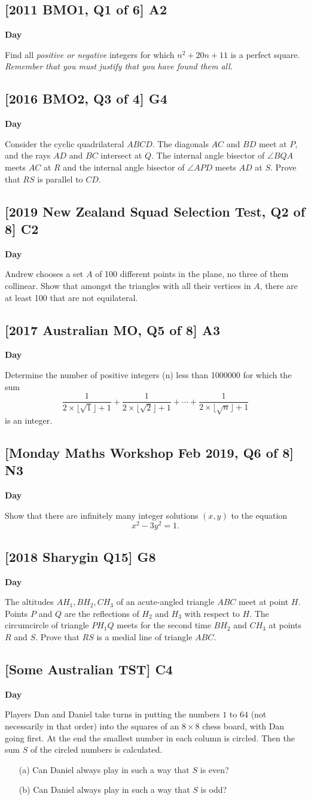 \documentclass[10pt]{article}
\newcommand{\themonth}{March}
\newcommand{\theyear}{2019}
\newcounter{day}
\newcounter{solution}
\newcounter{datenumber}
\newcommand{\problem}[4][0]{
	\newpage
	\subsection{[#3] \space #2} \hfill 
	{\large\textbf{Day \arabic{day}}} %
	\begin{flushleft} #4 \end{flushleft}
	\vspace{1em}
	\addtocounter{day}{1}
	\addtocounter{datenumber}{1}
	\setcounter{solution}{1}
}
\begin{document}
\problem[57]{A2}{2011 BMO1, Q1 of 6}{Find all \emph{positive or negative} integers for which $n^2+20n+11$ is a perfect square. \textit{Remember that you must justify that you have found them all.}}

\problem[58]{G4}{2016 BMO2, Q3 of 4}{Consider the cyclic quadrilateral \(ABCD\). The diagonals \(AC\) and \(BD\) meet at \(P\), and the rays \(AD\) and \(BC\) intersect at \(Q\). The internal angle bisector of \(\angle BQA\) meets \(AC\) at \(R\) and the internal angle bisector of \(\angle APD\) meets \(AD\) at \(S\). Prove that \(RS\) is parallel to \(CD\).}

\problem[59]{C2}{2019 New Zealand Squad Selection Test, Q2 of 8}{Andrew chooses a set $A$ of 100 different points in the plane, no three of them collinear. Show that amongst the triangles with all their vertices in $A$, there are at least 100 that are not equilateral.}

\problem[60]{A3}{2017 Australian MO, Q5 of 8}{Determine the number of positive integers (n) less than 1000000 for which the sum \[\frac{1}{2 \times \lfloor \sqrt{1} \rfloor + 1} + \frac{1}{2 \times \lfloor \sqrt{2} \rfloor + 1} + \cdots +\frac{1}{2 \times \lfloor \sqrt{n} \rfloor + 1}\] is an integer.}

\problem[61]{N3}{Monday Maths Workshop Feb 2019, Q6 of 8}{Show that there are infinitely many integer solutions $(x, y)$ to the equation \[x^2-3y^2=1.\]}

\problem[62]{G8}{2018 Sharygin Q15}{The altitudes $AH_1,BH_2,CH_3$ of an acute-angled triangle $ABC$ meet at point $H$. Points $P$ and $Q$ are the reflections of $H_2$ and $H_3$ with respect to $H$. The circumcircle of triangle $PH_1Q$ meets for the second time $BH_2$ and $CH_3$ at points $R$ and $S$. Prove that $RS$ is a medial line of triangle $ABC$.}

\problem[63]{C4}{Some Australian TST}{Players Dan and Daniel take turns in putting the numbers $1$ to $64$ (not necessarily in that order) into the squares of an $8 \times 8$ chess board, with Dan going first. At the end the smallest number in each column is circled. Then the sum $S$ of the circled numbers is calculated.
	
	\begin{enumerate}
		\item[(a)] Can Daniel always play in such a way that $S$ is even?
		
		\item[(b)] Can Daniel always play in such a way that $S$ is odd?
	\end{enumerate}}
\end{document}
